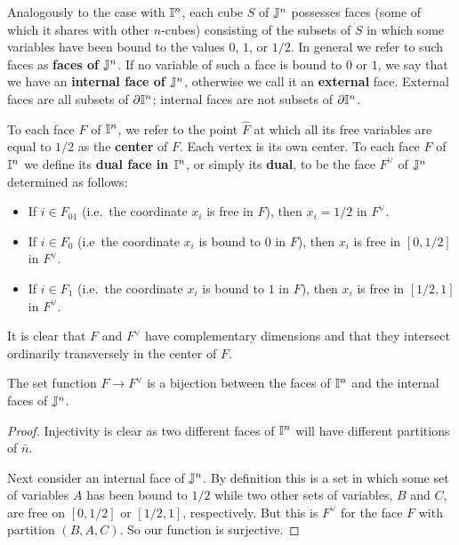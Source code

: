 Analogously to the case with $\mathbb{I}^n$, each cube $S$ of $\mathbb{J}^n$ possesses faces (some of which it shares with other $n$-cubes) consisting of the subsets of $S$ in which some variables have been bound to the values $0$, $1$, or $1/2$. In general we refer to such faces as \textbf{faces of $\mathbb{J}^n$}. If no variable of such a face is bound to $0$ or $1$, we say that we have an \textbf{internal face of $\mathbb{J}^n$}, otherwise we call it an \textbf{external} face. External faces are all subsets of $\partial \mathbb{I}^n$; internal faces are not subsets of $\partial \mathbb{I}^n$.

To each face $F$ of $\mathbb{I}^n$, we refer to the point $\hat F$ at which all its free variables are equal to $1/2$ as the \textbf{center} of $F$. Each vertex is its own center. To each face $F$ of $\mathbb{I}^n$ we define its \textbf{dual face in $\mathbb{I}^n$}, or simply its \textbf{dual}, to be the face $F^\vee$ of $\mathbb{J}^n$ determined as follows:
\begin{itemize}
\item If $i\in F_{01}$ (i.e.\ the coordinate $x_i$ is free in $F$), then $x_i=1/2$ in $F^\vee$.

\item If $i\in F_0$ (i.e\ the coordinate $x_i$ is bound to $0$ in $F$), then $x_i$ is free in $[0,1/2]$ in $F^\vee$.

\item If $i\in F_1$ (i.e.\ the coordinate $x_i$ is bound to $1$ in $F$), then $x_i$ is free in $[1/2,1]$ in $F^\vee$.
\end{itemize}

It is clear that $F$ and $F^\vee$ have complementary dimensions and that they intersect ordinarily transversely in the center of $F$.

\begin{lemma}
The set function $F\to F^\vee$ is a bijection between the faces of $\mathbb{I}^n$ and the internal faces of $\mathbb{J}^n$.
\end{lemma}
\begin{proof}
Injectivity is clear as two different faces of $\mathbb{I}^n$ will have different partitions of $\bar n$.

Next consider an internal face of $\mathbb{J}^n$. By definition this is a set in which some set of variables $A$ has  been bound to $1/2$ while two other sets of variables, $B$ and $C$, are free on $[0,1/2]$ or $[1/2,1]$, respectively. But this is $F^\vee$ for the face $F$ with partition $(B,A,C)$. So our function is surjective.
\end{proof}

